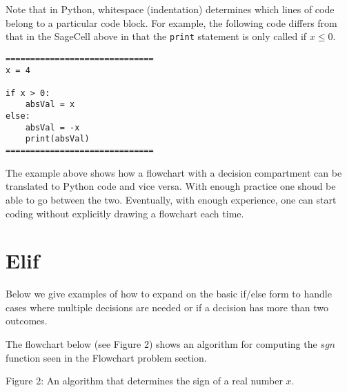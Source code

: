 \documentclass{ximera}
\begin{document}
Note that in Python, whitespace (indentation) determines which lines of code belong to a particular code block. For example, the following code differs from that in the SageCell above in that the \verb|print| statement is only called if $x\leq 0$.

\begin{verbatim}
==============================
x = 4

if x > 0:
	absVal = x
else:
	absVal = -x
	print(absVal)
==============================
\end{verbatim}

The example above shows how a flowchart with a decision compartment can be translated to Python code and vice versa. With enough practice one shoud be able to go between the two. Eventually, with enough experience, one can start coding without explicitly drawing a flowchart each time.

\section{Elif}

Below we give examples of how to expand on the basic if/else form to handle cases where multiple decisions are needed or if a decision has more than two outcomes.

The flowchart below (see Figure 2) shows an algorithm for computing the $sgn$ function seen in the Flowchart problem section.

\begin{center}
\end{center}
\begin{center}
    Figure 2: An algorithm that determines the sign of a real number $x$.
\end{center}
\end{document}
